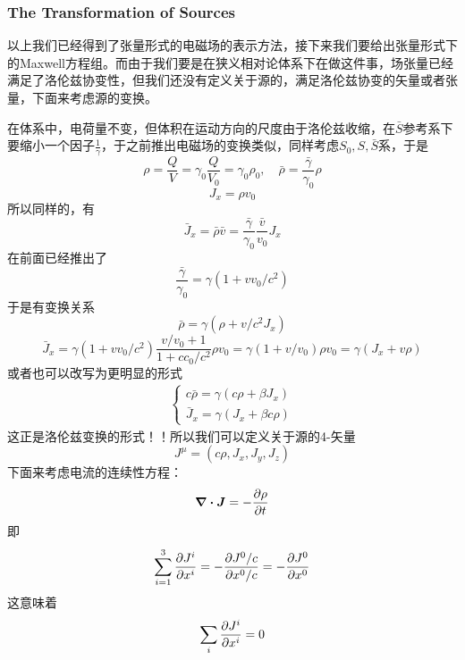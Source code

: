 \documentclass[14pt,oneside]{book}
\def \J{\vb*{J}}
\begin{document}
\begin{large}
\subsubsection{The Transformation of Sources}
以上我们已经得到了张量形式的电磁场的表示方法，接下来我们要给出张量形式下的Maxwell方程组。而由于我们要是在狭义相对论体系下在做这件事，场张量已经满足了洛伦兹协变性，但我们还没有定义关于源的，满足洛伦兹协变的矢量或者张量，下面来考虑源的变换。

在体系中，电荷量不变，但体积在运动方向的尺度由于洛伦兹收缩，在$\bar S$参考系下要缩小一个因子$\frac{1}{\gamma}$，于之前推出电磁场的变换类似，同样考虑$S_0,S,\bar S$系，于是
\begin{equation}
  \rho=\frac{Q}{V}=\gamma_0\frac{Q}{V_0}=\gamma_0 \rho_0,\quad \bar\rho=\frac{\bar\gamma}{\gamma_0}\rho
\end{equation}
\begin{equation}
  J_x=\rho v_0 
\end{equation}
所以同样的，有
\begin{equation}
  \bar J_x=\bar \rho \bar v=\frac{\bar\gamma}{\gamma_0}\frac{\bar v}{v_0}J_x
\end{equation}
在前面已经推出了
\begin{equation}
  \frac{\bar\gamma}{\gamma_0}=\gamma(1+vv_0/c^2)
\end{equation}
于是有变换关系
\begin{equation}
  \bar \rho=\gamma(\rho+v/c^2 J_x)
\end{equation}
\begin{equation}
  \bar J_x=\gamma(1+vv_0/c^2)\frac{v/v_0+1}{1+cc_0/c^2}\rho v_0=\gamma(1+v/v_0)\rho v_0=\gamma(J_x+v\rho)
\end{equation}
或者也可以改写为更明显的形式
\begin{align}
\begin{cases}
	c\bar \rho=\gamma(c\rho+\beta J_x)\\
	\bar J_x=\gamma(J_x+\beta c\rho)
\end{cases}
\end{align}
这正是洛伦兹变换的形式！！所以我们可以定义关于源的4-矢量
\begin{equation}
  J^{\mu}=(c\rho,J_x,J_y,J_z)
\end{equation}
下面来考虑电流的连续性方程：
\begin{equation}
  \div{\J}=-\pdv{\rho}{t}
\end{equation}
即
\begin{equation}
  \sum_{i=1}^3 \pdv{J^i}{x^i}=-\pdv{J^0/c}{x^0/c}=-\pdv{J^0}{x^0}
\end{equation}
这意味着
\begin{equation}
  \sum_i \pdv{J^i}{x^i}=0
\end{equation}

\end{large}
\end{document}
